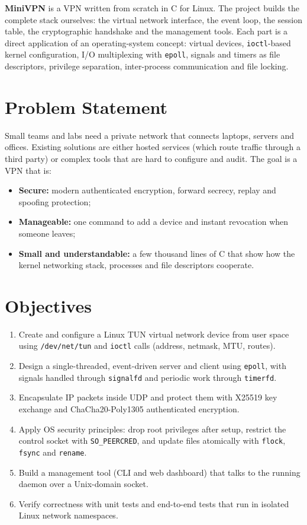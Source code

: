 \documentclass[12pt,a4paper]{article}
\begin{document}
\textbf{MiniVPN} is a VPN written from scratch in C for Linux. The project builds the
complete stack ourselves: the virtual network interface, the event loop, the session
table, the cryptographic handshake and the management tools. Each part is a direct
application of an operating-system concept: virtual devices, \texttt{ioctl}-based kernel
configuration, I/O multiplexing with \texttt{epoll}, signals and timers as file
descriptors, privilege separation, inter-process communication and file locking.

\section{Problem Statement}
Small teams and labs need a private network that connects laptops, servers and offices.
Existing solutions are either hosted services (which route traffic through a third
party) or complex tools that are hard to configure and audit. The goal is a VPN that is:
\begin{itemize}
  \item \textbf{Secure:} modern authenticated encryption, forward secrecy, replay and spoofing protection;
  \item \textbf{Manageable:} one command to add a device and instant revocation when someone leaves;
  \item \textbf{Small and understandable:} a few thousand lines of C that show how the kernel
        networking stack, processes and file descriptors cooperate.
\end{itemize}

\section{Objectives}
\begin{enumerate}
  \item Create and configure a Linux TUN virtual network device from user space using
        \texttt{/dev/net/tun} and \texttt{ioctl} calls (address, netmask, MTU, routes).
  \item Design a single-threaded, event-driven server and client using \texttt{epoll},
        with signals handled through \texttt{signalfd} and periodic work through \texttt{timerfd}.
  \item Encapsulate IP packets inside UDP and protect them with X25519 key exchange and
        ChaCha20-Poly1305 authenticated encryption.
  \item Apply OS security principles: drop root privileges after setup, restrict the
        control socket with \texttt{SO\_PEERCRED}, and update files atomically with
        \texttt{flock}, \texttt{fsync} and \texttt{rename}.
  \item Build a management tool (CLI and web dashboard) that talks to the running daemon
        over a Unix-domain socket.
  \item Verify correctness with unit tests and end-to-end tests that run in isolated
        Linux network namespaces.
\end{enumerate}
\end{document}
